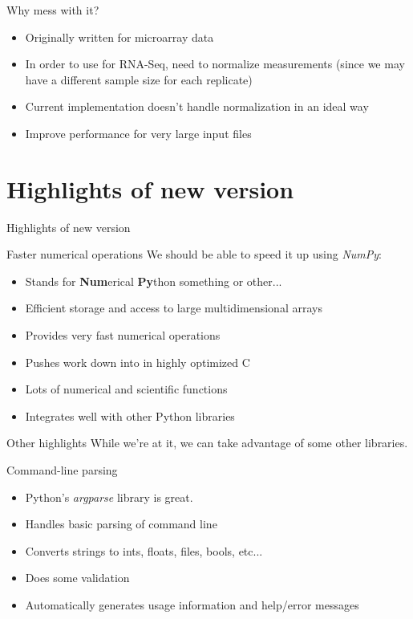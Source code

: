 \documentclass{beamer}
\begin{document}
\begin{frame}{Why mess with it?}
  \begin{itemize}
  \item Originally written for microarray data
  \item In order to use for RNA-Seq, need to normalize measurements
    (since we may have a different sample size for each replicate)
  \item Current implementation doesn't handle normalization in an ideal way
  \item Improve performance for very large input files
  \end{itemize}
\end{frame}

\section{Highlights of new version}
\begin{frame}
  \begin{centering}
    {\Large{Highlights of new version}}
  \end{centering}
\end{frame}

\begin{frame}{Faster numerical operations}
  We should be able to speed it up using {\em NumPy}:
  \begin{itemize}
  \item Stands for {\bf Num}erical {\bf Py}thon something or other...
  \item Efficient storage and access to large multidimensional arrays
  \item Provides very fast numerical operations
  \item Pushes work down into in highly optimized C
  \item Lots of numerical and scientific functions
  \item Integrates well with other Python libraries
  \end{itemize}
\end{frame}

\begin{frame}{Other highlights}
  While we're at it, we can take advantage of some other libraries.
\end{frame}

\begin{frame}{Command-line parsing}
    \begin{itemize}
    \item Python's {\em argparse} library is great.
    \item Handles basic parsing of command line
    \item Converts strings to ints, floats, files, bools, etc...
    \item Does some validation
    \item Automatically generates usage information and help/error messages
    \end{itemize}
\end{frame}
\end{document}
